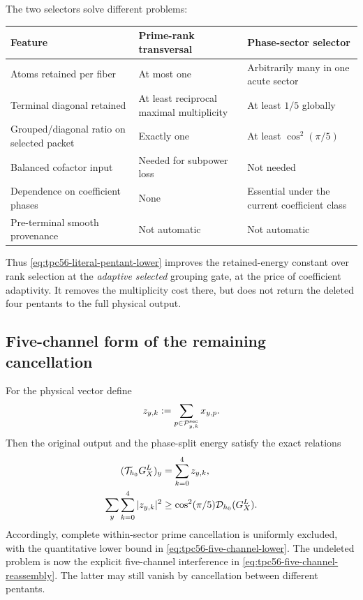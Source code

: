 The two selectors solve different problems:
\begin{center}
\small
\begin{tabular}{>{\raggedright\arraybackslash}p{}
                >{\raggedright\arraybackslash}p{}
                >{\raggedright\arraybackslash}p{}}
\toprule
Feature & Prime-rank transversal & Phase-sector selector \\
\midrule
Atoms retained per fiber
& At most one
& Arbitrarily many in one acute sector \\
Terminal diagonal retained
& At least reciprocal maximal multiplicity
& At least \(1/5\) globally \\
Grouped/diagonal ratio on selected packet
& Exactly one
& At least \(\cos^2(\pi/5)\) \\
Balanced cofactor input
& Needed for subpower loss
& Not needed \\
Dependence on coefficient phases
& None
& Essential under the current coefficient class \\
Pre-terminal smooth provenance
& Not automatic
& Not automatic \\
\bottomrule
\end{tabular}
\end{center}

Thus \eqref{eq:tpc56-literal-pentant-lower} improves the retained-energy
constant over rank selection at the \emph{adaptive selected} grouping gate,
at the price of coefficient adaptivity.  It removes the multiplicity cost
there, but does not return the deleted four pentants to the full physical
output.

\subsection{Five-channel form of the remaining cancellation}

For the physical vector define
\begin{equation}
 z_{y,k}:=
 \sum_{p\in\mathcal P_{y,k}^{\rm sec}}x_{y,p}.
 \label{eq:tpc56-sector-channel}
\end{equation}
Then the original output and the phase-split energy satisfy the exact
relations
\begin{align}
 (\mathcal T_{h_0}G_X^L)_y
 &=\sum_{k=0}^4z_{y,k},
 \label{eq:tpc56-five-channel-reassembly}\\
 \sum_y\sum_{k=0}^4|z_{y,k}|^2
 &\ge\cos^2(\pi/5)\mathcal D_{h_0}(G_X^L).
 \label{eq:tpc56-five-channel-lower}
\end{align}
Accordingly, complete within-sector prime cancellation is uniformly
excluded, with the quantitative lower bound in
\eqref{eq:tpc56-five-channel-lower}.  The undeleted problem is now the explicit
five-channel interference in \eqref{eq:tpc56-five-channel-reassembly}.
The latter may still vanish by cancellation between different pentants.
